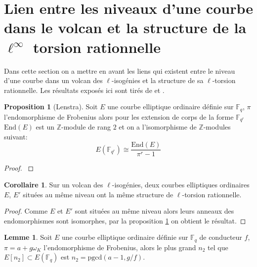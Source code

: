 \documentclass[10pt,a4paper]{book}
\theoremstyle{plain}
\theoremstyle{definition}
\theoremstyle{definition}
\newtheorem{lem}[thm]{Lemme}
\theoremstyle{definition}
\newtheorem{cor}[thm]{Corollaire}
\theoremstyle{definition}
\newtheorem{prop}[thm]{Proposition}
\theoremstyle{definition}
\theoremstyle{remark}
\theoremstyle{remark}
\theoremstyle{definition}
\begin{document}
\section{Lien entre les niveaux d'une courbe dans le volcan et la structure de la $\ell^{\infty}$ torsion rationnelle}
\label{sec:lie:niv}
Dans cette section on a mettre en avant les liens qui existent entre le niveau
d'une courbe dans un volcan des $\ell$-isogénies et la structure de sa 
$\ell$-torsion rationnelle. Les résultats exposés ici sont tirés de 
\cite{MiretMSTV08} et \cite{Ionica-Joux10}.

\begin{prop}[Lenstra]
\label{pro:len:str}
Soit $E$ une courbe elliptique ordinaire définie sur $\mathbb{F}_q$, $\pi$ 
l'endomorphisme de Frobenius alors pour les 
extension de corps de la forme $\mathbb{F}_{q^r}$ $\mathrm{End}(E)$ est un 
$\mathbb{Z}$-module de rang $2$ et on a 
l'isomorphisme de $\mathbb{Z}$-modules suivant:
\[
E(\mathbb{F}_{q^r}) \cong \frac{\mathrm{End}(E)}{\pi^{r}-1}
\] 
\end{prop}  

\begin{proof}
\cite[Theorem 1]{Lenstra96}
\end{proof}

\begin{cor}
Sur un volcan des $\ell$-isogénies, deux courbes elliptiques ordinaires $E$, $E'$ situées au même niveau ont la même structure de $\ell$-torsion rationnelle.
\end{cor}

\begin{proof}
Comme $E$ et $E'$ sont situées au même niveau alors leurs anneaux 
des endomorphismes sont isomorphes, par la proposition \ref{pro:len:str} on 
obtient le résultat.
\end{proof}


\begin{lem}
\label{lem:ruc:rat}
Soit $E$ une courbe elliptique ordinaire définie sur $\mathbb{F}_q$ de 
conducteur $f$, $\pi=a+g \omega_K$ l'endomorphisme de Frobenius, alors le plus 
grand $n_2$ tel que $E[n_2] \subset E(\mathbb{F}_q)$ est $n_2=
\mathrm{pgcd}(a-1,g/f)$.
\end{lem}
\end{document}
